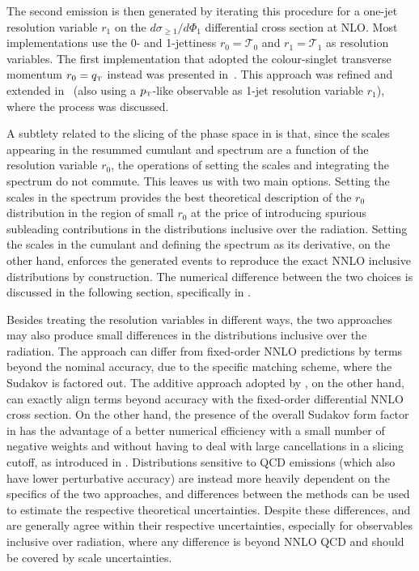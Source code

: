 \documentclass[11pt,a4paper]{article}
\begin{document}
The second emission is then generated by iterating this procedure 
for a one-jet resolution variable $r_1$ on
the $d\sigma_{\geq 1} / d\Phi_1$ differential cross section at NLO. Most
\GENEVA{} implementations use the 0- and 1-jettiness $r_0=\mathcal{T}_0$
and $r_1=\mathcal{T}_1$ as resolution variables. The first implementation
that adopted the colour-singlet transverse momentum
$r_0=q_{\scriptscriptstyle\rm T}$ instead was presented
in~. This approach was refined and extended
in~ (also using a $p_{\scriptscriptstyle\rm
  T}$-like observable as 1-jet resolution variable $r_1$), where the \bbtoH{} process was discussed.

A subtlety related to the slicing of the phase space in \GENEVA{} is
that, since the scales appearing in the resummed cumulant and spectrum
are a function of the resolution variable $r_0$, the operations of
setting the scales and integrating the spectrum do not commute. This
leaves us with two main options. Setting the scales in the spectrum
provides the best theoretical description of the $r_0$ distribution in
the region of small $r_0$ at the price of introducing spurious
subleading contributions in the distributions inclusive over the
radiation. Setting the scales in the cumulant and defining the
spectrum as its derivative, on the other hand, enforces the generated
events to reproduce the exact NNLO inclusive distributions by
construction. The numerical difference between the two choices is discussed in the following section, specifically in .

Besides treating the resolution variables in different ways, the two
approaches may also produce small differences in the distributions
inclusive over the radiation. The \minnlo{} approach can differ from 
fixed-order NNLO predictions by terms beyond the nominal accuracy,
due to the specific matching scheme, where the Sudakov is factored out.
 The additive approach
adopted by \GENEVA{}, on the other hand, can exactly align 
terms beyond accuracy with the fixed-order differential NNLO cross section.
On the other hand, the presence of the overall Sudakov form factor in
\minnlo{} has the advantage of a better numerical efficiency with a small number of 
negative weights and without having to deal with large cancellations in a
slicing cutoff, as introduced in \GENEVA{}. Distributions sensitive
to QCD emissions 
(which also have lower perturbative accuracy) are instead more heavily
dependent on the specifics of the two approaches, and differences between
the methods can be used to estimate the respective theoretical
uncertainties. Despite these differences, \minnlo{} and \GENEVA{} are generally 
agree within their respective uncertainties, especially for observables inclusive 
over radiation, where any difference is beyond NNLO QCD and should be 
covered by scale uncertainties.
\end{document}

